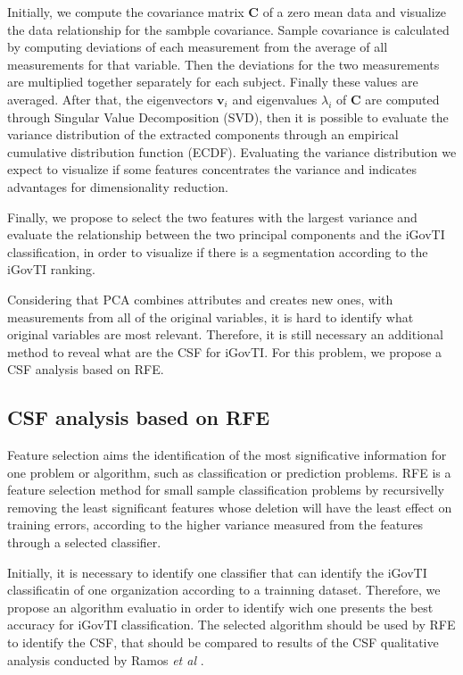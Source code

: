 Initially, we compute the covariance matrix $\mathbf{C}$ of a zero mean data and visualize the data relationship for the sambple covariance. Sample covariance is calculated by computing deviations of each measurement from the average of all measurements for that variable. Then the deviations for the two measurements are multiplied together separately for each subject. Finally these values are averaged. After that, the eigenvectors $\mathbf{v}_i$ and eigenvalues $\lambda_i$ of $\mathbf{C}$ are computed through Singular Value Decomposition (SVD), then it is possible to evaluate the variance distribution of the extracted components through an empirical cumulative distribution function (ECDF). Evaluating the variance distribution we expect to visualize if some features concentrates the variance and indicates advantages for dimensionality reduction.

Finally, we propose to select the two features with the largest variance and evaluate the relationship between the two principal components and the iGovTI classification, in order to visualize if there is a segmentation according to the iGovTI ranking.

Considering that PCA combines attributes and creates new ones, with measurements from all of the original variables, it is hard to identify what original variables are most relevant. Therefore, it is still necessary an additional method to reveal what are the CSF for iGovTI. For this problem, we propose a CSF analysis based on RFE.

\subsection{CSF analysis based on RFE}
\label{sec:b_csfa}

Feature selection aims the identification of the most significative information for one problem or algorithm, such as classification or prediction problems. RFE is a feature selection method for small sample classification problems by recursivelly removing the least significant features whose deletion will have the least effect on training errors, according to the higher variance measured from the features through a selected classifier. 

Initially, it is necessary to identify one classifier that can identify the iGovTI classificatin of one organization according to a trainning dataset. Therefore, we propose an algorithm evaluatio in order to identify wich one presents the best accuracy for iGovTI classification. The selected algorithm should be used by RFE to identify the CSF, that should be compared to results of the CSF qualitative analysis conducted by Ramos \emph{et al} \cite{ramos2016information}.

